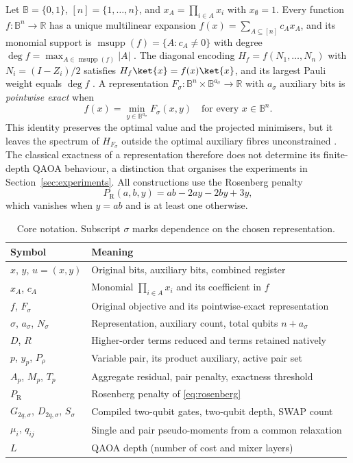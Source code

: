 \documentclass{ieeeaccess}
\newcommand{\B}{\mathbb{B}}
\newcommand{\R}{\mathbb{R}}
\newcommand{\PR}{P_{\mathrm{R}}}
\DeclareMathOperator{\msupp}{msupp}
\begin{document}
Let $\B=\{0,1\}$, $[n]=\{1,\dots,n\}$, and $x_A=\prod_{i\in A}x_i$ with $x_\emptyset=1$.
Every function $f\colon\B^n\to\R$ has a unique multilinear expansion
$f(x)=\sum_{A\subseteq[n]}c_A x_A$, and its monomial support is
$\msupp(f)=\{A : c_A\neq 0\}$ with degree $\deg f=\max_{A\in\msupp(f)}|A|$
\cite{BorosHammer2002,Hadfield2021}. The diagonal encoding
$H_f=f(N_1,\dots,N_n)$ with $N_i=(I-Z_i)/2$ satisfies $H_f\ket{x}=f(x)\ket{x}$, and
its largest Pauli weight equals $\deg f$ \cite{Hadfield2021}. A representation
$F_\sigma\colon\B^{n}\times\B^{a_\sigma}\to\R$ with $a_\sigma$ auxiliary bits is
\emph{pointwise exact} when
\begin{equation}
f(x)=\min_{y\in\B^{a_\sigma}}F_\sigma(x,y)\quad\text{for every }x\in\B^n .
\label{eq:pointwise}
\end{equation}
This identity preserves the optimal value and the projected minimisers, but it leaves
the spectrum of $H_{F_\sigma}$ outside the optimal auxiliary fibres unconstrained
\cite{BorosGruber2014,Dattani2019}. The classical exactness of a representation
therefore does not determine its finite-depth QAOA behaviour, a distinction that
organises the experiments in Section~\ref{sec:experiments}. All constructions use the
Rosenberg penalty \cite{Rosenberg1975}
\begin{equation}
\PR(a,b,y)=ab-2ay-2by+3y,
\label{eq:rosenberg}
\end{equation}
which vanishes when $y=ab$ and is at least one otherwise.

\begin{table}[!t]
\caption{Core notation. Subscript $\sigma$ marks dependence on the chosen representation.}
\label{tab:notation}
\centering
\footnotesize
\setlength{\tabcolsep}{4pt}
\begin{tabular}{ll}
\toprule
Symbol & Meaning \\
\midrule
$x$, $y$, $u=(x,y)$ & Original bits, auxiliary bits, combined register \\
$x_A$, $c_A$ & Monomial $\prod_{i\in A}x_i$ and its coefficient in $f$ \\
$f$, $F_\sigma$ & Original objective and its pointwise-exact representation \\
$\sigma$, $a_\sigma$, $N_\sigma$ & Representation, auxiliary count, total qubits $n+a_\sigma$ \\
$D$, $R$ & Higher-order terms reduced and terms retained natively \\
$p$, $y_p$, $P_\rho$ & Variable pair, its product auxiliary, active pair set \\
$A_p$, $M_p$, $T_p$ & Aggregate residual, pair penalty, exactness threshold \\
$\PR$ & Rosenberg penalty of \eqref{eq:rosenberg} \\
$G_{2q,\sigma}$, $D_{2q,\sigma}$, $S_\sigma$ & Compiled two-qubit gates, two-qubit depth, SWAP count \\
$\mu_i$, $q_{ij}$ & Single and pair pseudo-moments from a common relaxation \\
$L$ & QAOA depth (number of cost and mixer layers) \\
\bottomrule
\end{tabular}
\end{table}
\end{document}
